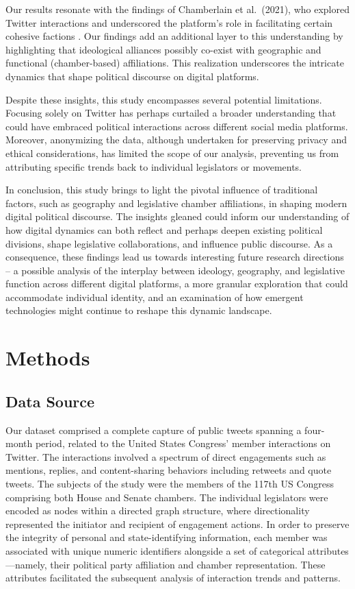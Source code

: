 \documentclass[11pt]{article}
\begin{document}
Our results resonate with the findings of Chamberlain et al.\ (2021), who explored Twitter interactions and underscored the platform's role in facilitating certain cohesive factions \cite{Chamberlain2021ANA}. Our findings add an additional layer to this understanding by highlighting that ideological alliances possibly co-exist with geographic and functional (chamber-based) affiliations. This realization underscores the intricate dynamics that shape political discourse on digital platforms.

Despite these insights, this study encompasses several potential limitations. Focusing solely on Twitter has perhaps curtailed a broader understanding that could have embraced political interactions across different social media platforms. Moreover, anonymizing the data, although undertaken for preserving privacy and ethical considerations, has limited the scope of our analysis, preventing us from attributing specific trends back to individual legislators or movements.

In conclusion, this study brings to light the pivotal influence of traditional factors, such as geography and legislative chamber affiliations, in shaping modern digital political discourse. The insights gleaned could inform our understanding of how digital dynamics can both reflect and perhaps deepen existing political divisions, shape legislative collaborations, and influence public discourse. As a consequence, these findings lead us towards interesting future research directions – a possible analysis of the interplay between ideology, geography, and legislative function across different digital platforms, a more granular exploration that could accommodate individual identity, and an examination of how emergent technologies might continue to reshape this dynamic landscape.

\section*{Methods}

\subsection*{Data Source}

Our dataset comprised a complete capture of public tweets spanning a four-month period, related to the United States Congress' member interactions on Twitter. The interactions involved a spectrum of direct engagements such as mentions, replies, and content-sharing behaviors including retweets and quote tweets. The subjects of the study were the members of the 117th US Congress comprising both House and Senate chambers. The individual legislators were encoded as nodes within a directed graph structure, where directionality represented the initiator and recipient of engagement actions. In order to preserve the integrity of personal and state-identifying information, each member was associated with unique numeric identifiers alongside a set of categorical attributes—namely, their political party affiliation and chamber representation. These attributes facilitated the subsequent analysis of interaction trends and patterns.
\end{document}
